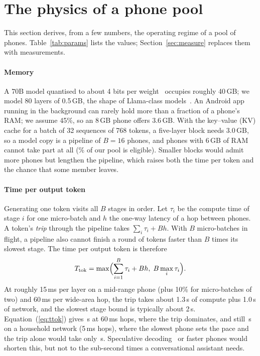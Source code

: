 \documentclass[preprint,review,12pt,authoryear]{elsarticle}
\begin{document}
\section{The physics of a phone pool}
\label{sec:physics}

This section derives, from a few numbers, the operating regime of a pool of
phones. Table~\ref{tab:params} lists the values; Section~\ref{sec:measure}
replaces them with measurements.

\paragraph{Memory} A 70B model quantised to about 4 bits per
weight~\citep{gptq,awq} occupies roughly 40\,GB; we model 80 layers of
0.5\,GB, the shape of Llama-class models~\citep{llama2,llama3}. An Android app
running in the background can rarely hold more than a fraction of a phone's
RAM; we assume 45\%, so an 8\,GB phone offers 3.6\,GB. With the key--value
(KV) cache for a batch of 32 sequences of 768 tokens, a five-layer block needs
3.0\,GB, so a model copy is a pipeline of $B=16$ phones, and phones with
6\,GB of RAM cannot take part at all (\EligiblePct\% of our pool is
eligible). Smaller blocks would admit more phones but lengthen the pipeline,
which raises both the time per token and the chance that some member leaves.

\paragraph{Time per output token} Generating one token visits all $B$
stages in order. Let $\tau_i$ be the compute time of stage $i$ for one
micro-batch and $h$ the one-way latency of a hop between phones. A token's
\emph{trip} through the pipeline takes $\sum_i \tau_i + B h$. With $B$
micro-batches in flight, a pipeline also cannot finish a round of tokens faster
than $B$ times its slowest stage. The time per output token is therefore
\begin{equation}
T_{\text{tok}} = \max\Bigl(\sum_{i=1}^{B}\tau_i + B h,\; B \max_i \tau_i\Bigr).
\label{eq:ttok}
\end{equation}
At roughly 15\,ms per layer on a mid-range phone (plus 10\% for micro-batches
of two) and 60\,ms per wide-area hop, the trip takes about 1.3\,s of compute
plus 1.0\,s of network, and the slowest stage bound is typically about 2\,s.
Equation~(\ref{eq:ttok}) gives \LatWAN\,s at 60\,ms hops, where the trip
dominates, and still \LatLAN\,s on a household network (5\,ms hops), where the
slowest phone sets the pace and the trip alone would take only \PassLAN\,s.
Speculative decoding~\citep{specdec} or faster phones would shorten this, but
not to the sub-second times a conversational assistant needs.
\end{document}
